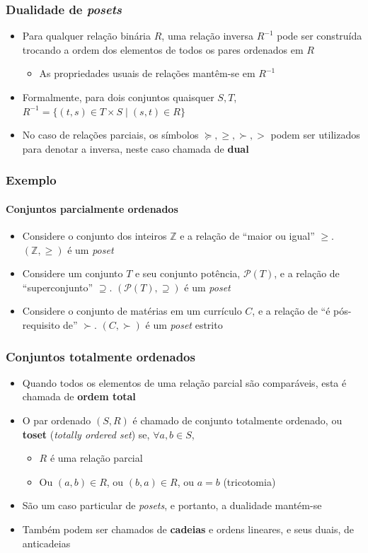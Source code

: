\documentclass[12pt]{beamer}
\begin{document}
\begin{frame}
  \frametitle{Dualidade de \emph{posets}}
  \begin{itemize}
    \item Para qualquer relação binária $R$, uma relação inversa $R^{-1}$ pode
        ser construída trocando a ordem dos elementos de todos os pares
          ordenados em $R$
    \begin{itemize}
      \item As propriedades usuais de relações mantêm-se em $R^{-1}$
    \end{itemize}
    \item Formalmente, para dois conjuntos quaisquer $S, T$, $R^{-1} = \{(t, s)
        \in T \times S \mid (s, t) \in R\}$
    \item No caso de relações parciais, os símbolos $\succcurlyeq, \geq, \succ,
        >$ podem ser utilizados para denotar a inversa, neste caso chamada de
          \textbf{dual}
  \end{itemize}
\end{frame}

\begin{frame}
  \frametitle{Exemplo}
  \framesubtitle{Conjuntos parcialmente ordenados}
  \begin{itemize}
    \item Considere o conjunto dos inteiros $\mathbb{Z}$ e a relação de ``maior
        ou igual'' $\geq$. $(\mathbb{Z}, \geq)$ é um \emph{poset}
    \item Considere um conjunto $T$ e seu conjunto potência, $\mathcal{P}(T)$,
        e a relação de ``superconjunto'' $\supseteq$.  $(\mathcal{P}(T),
          \supseteq)$ é um \emph{poset}
    \item Considere o conjunto de matérias em um currículo $C$, e a relação de
        ``é pós-requisito de'' $\succ$. $(C, \succ)$ é um \emph{poset} estrito
  \end{itemize}
\end{frame}

\begin{frame}
  \frametitle{Conjuntos totalmente ordenados}
  \begin{itemize}
    \item Quando todos os elementos de uma relação parcial são comparáveis,
        esta é chamada de \textbf{ordem total}
    \item O par ordenado $(S, R)$ é chamado de conjunto totalmente ordenado, ou
        \textbf{toset} (\emph{totally ordered set}) se, $\forall a, b \in S$,
    \begin{itemize}[itemsep=0pt]
      \item $R$ é uma relação parcial
      \item Ou $(a, b) \in R$, ou $(b, a) \in R$, ou $a = b$ (tricotomia)
    \end{itemize}
    \item São um caso particular de \emph{posets}, e portanto, a dualidade
        mantém-se
    \item Também podem ser chamados de \textbf{cadeias} e ordens lineares, e
        seus duais, de anticadeias
  \end{itemize}
\end{frame}
\end{document}
